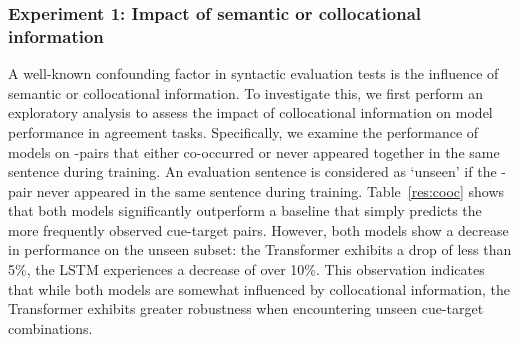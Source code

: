 \subsubsection{Experiment 1: Impact of semantic or collocational information} \label{subsec:nonce_exp}
\noindent
A well-known confounding factor in syntactic evaluation tests is the influence of semantic or collocational information. To investigate this, we first perform an exploratory analysis to assess the impact of collocational information on model performance in agreement tasks. Specifically, we examine the performance of models on \cue-\target pairs that either co-occurred or never appeared together in the same sentence during training. An evaluation sentence is considered as `unseen' if the \cue-\target pair never appeared in the same sentence during training. Table~\ref{res:cooc} shows that both models significantly outperform a baseline that simply predicts the more frequently observed cue-target pairs. However, both models show a decrease in performance on the unseen subset: the Transformer exhibits a drop of less than 5\%, the LSTM experiences a decrease of over 10\%. This observation indicates that while both models are somewhat influenced by collocational information, the Transformer exhibits greater robustness when encountering unseen cue-target combinations.

\begin{table}[ht]
\centering
{}
\caption{Accuracy breakdown based on whether the \cue-\target pair was seen (occurrence > 0) or unseen (occurrence = 0) during pre-training. The baseline \texttt{argmax$_v$(\cue-\target)} consistently predicts the more frequently observed pairs. If both the target and competing pairs were unseen, this baseline model randomly selects one pair.  \label{res:cooc}}
\end{table}

